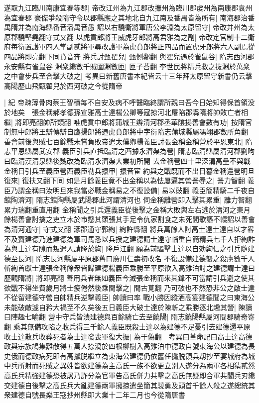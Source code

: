 遂取九江臨川南康宜春等郡|{
	帝改江州為九江郡改撫州為臨川郡䖍州為南康郡袁州為宜春郡}
豪傑爭殺隋守令以郡縣應之其地北自九江南及番禺皆為所有|{
	南海郡治番禺隋并為南海縣番音潘禺音愚}
詔以右驍衛將軍唐公李淵為太原留守|{
	帝改并州為太原郡驍堅堯翻守式又翻}
以虎賁郎將王威虎牙郎將高君雅為之副|{
	帝改定官制十二衛府每衛置護軍四人掌副貳將軍尋改護軍為虎賁郎將正四品而置虎牙郎將六人副焉從四品將即亮翻下同賁音奔}
將兵討甄翟兒|{
	甄側鄰翻}
與翟兒遇於雀鼠谷|{
	隋志西河郡永安縣有雀鼠谷}
淵衆纔數千賊圍淵數匝|{
	匝子荅翻}
李世民將精兵救之抜淵於萬衆之中會步兵至合擊大破之|{
	考異曰新舊唐書本紀皆云十三年拜太原留守新書仍云擊高陽歷山飛甄翟兒於西河破之今從隋帝}


|{
	紀}
帝疎薄骨肉蔡王智積每不自安及病不呼醫臨終謂所親曰吾今日始知得保首領没於地矣　張金稱郝孝德孫宣雅高士達楊公卿等寇掠河北屠陷郡縣隋將帥敗亡者相繼|{
	將即亮翻帥所類翻}
唯虎賁中郎將蒲城王辯清河郡丞華隂揚善會數有功|{
	按隋官制無中郎將王辯傳辯自鷹揚郎將遷虎賁郎將中字衍隋志蒲城縣屬馮翊郡數所角翻}
善會前後與賊七百餘戰未嘗負敗帝遣太僕卿楊義臣討張金稱金稱營於平恩東北|{
	隋志平恩縣屬武安郡}
義臣引兵直抵臨清之西據永濟渠為營|{
	隋志臨清縣屬清河郡劉昫曰臨清漢清泉縣後魏改為臨清永濟渠大業初所開}
去金稱營四十里深溝高壘不與戰金稱日引兵至義臣營西義臣勒兵擐甲|{
	擐音宦}
約與之戰既而不出日暮金稱還營明旦復來|{
	復扶又翻下同}
如是月餘義臣竟不出金稱以為怯屢逼其營詈辱之|{
	詈力智翻}
義臣乃謂金稱曰汝明旦來我當必戰金稱易之不復設備|{
	易以䜴翻}
義臣簡精騎二千夜自館陶濟河|{
	隋志館陶縣屬武陽郡此河謂清河也}
伺金稱離營即入擊其累重|{
	離力智翻累力瑞翻重直用翻}
金稱聞之引兵還義臣從後擊之金稱大敗與左右逃於清河之東月餘楊善會討擒之吏立木於市懸其頭張其手足令仇家割食之未死間歌謳不輟詔以善會為清河通守|{
	守式又翻}
涿郡通守郭絢|{
	絢許縣翻}
將兵萬餘人討高士達士達自以才畧不及竇建德乃進建德為軍司馬悉以兵授之建德請士達守輜重自簡精兵七千人拒絢詐為與士達有隙而叛遣人請降於絢|{
	降戶江翻}
願為前驅擊士達以自効絢信之引兵隨建德至長河|{
	隋志長河縣屬平原郡舊曰廣川仁壽初改名}
不復設備建德襲之殺虜數千人斬絢首獻士達張金稱餘衆皆歸建德楊義臣乘勝至平原欲入高雞泊討之建德謂士達曰歷觀隋將|{
	將即亮翻}
善用兵者無如義臣今滅張金稱而來其鋒不可當請引兵避之使其欲戰不得坐費歲月將士疲倦然後乘間擊之|{
	間古莧翻}
乃可破也不然恐非公之敵士達不從留建德守營自帥精兵逆擊義臣|{
	帥讀曰率}
戰小勝因縱酒高宴建德聞之曰東海公未能破敵遽自矜大禍至不久矣後五日義臣大破士達於陳斬之乘勝逐北趣其營|{
	陳讀曰陣趣七喻翻}
營中守兵皆潰建德與百餘騎亡去至饒陽|{
	隋志饒陽縣屬河間郡騎奇寄翻}
乘其無備攻陷之收兵得三千餘人義臣既殺士達以為建德不足憂引去建德還平原收士達散兵收葬死者為士達發喪軍復大振|{
	為于偽翻　考異曰革命記曰高士達高德政與宗族鳩集離散得五萬人捺渦於四根柳樹入高雞泊中德政自號東海公以建德為長史俄而德政病死即有高攩脱繼立為東海公建德仍依舊任攩脱領兵刼抄至宴城府為城中兵所射而死賊之異姓皆欲建德為主高氏一族不欲更立别人遂分為兩軍各相猜貳然高氏兵精強建德恐被屠乃詐分為官軍告高氏併力共擊之高氏無疑即合軍共闘兵刃纔交建德自後擊之高氏兵大亂建德兩軍擁掠遣坐簡其驍勇及頭首千餘人殺之遂總統其衆建德自號長樂王寇抄州縣即大業十二年二月也今從隋唐書}
